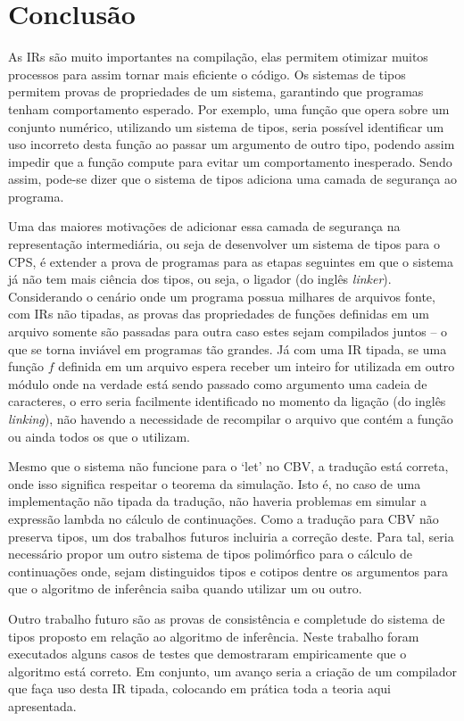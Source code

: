 \section{Conclusão}\label{sec:conclusao}
As IRs são muito importantes na compilação, elas permitem otimizar muitos processos para assim tornar mais eficiente o código.
Os sistemas de tipos permitem provas de propriedades de um sistema, garantindo que programas tenham comportamento esperado.
Por exemplo, uma função que opera sobre um conjunto numérico, utilizando um sistema de tipos, seria possível identificar um uso incorreto desta função ao passar um argumento de outro tipo, podendo assim impedir que a função compute para evitar um comportamento inesperado.
Sendo assim, pode-se dizer que o sistema de tipos adiciona uma camada de segurança ao programa.

Uma das maiores motivações de adicionar essa camada de segurança na representação intermediária, ou seja de desenvolver um sistema de tipos para o CPS, é extender a prova de programas para as etapas seguintes em que o sistema já não tem mais ciência dos tipos, ou seja, o ligador (do inglês \textit{linker}).
Considerando o cenário onde um programa possua milhares de arquivos fonte, com IRs não tipadas, as provas das propriedades de funções definidas em um arquivo somente são passadas para outra caso estes sejam compilados juntos -- o que se torna inviável em programas tão grandes.
Já com uma IR tipada, se uma função $f$ definida em um arquivo espera receber um inteiro for utilizada em outro módulo onde na verdade está sendo passado como argumento uma cadeia de caracteres, o erro seria facilmente identificado no momento da ligação (do inglês \textit{linking}), não havendo a necessidade de recompilar o arquivo que contém a função ou ainda todos os que o utilizam.

Mesmo que o sistema não funcione para o `let' no CBV, a tradução está correta, onde isso significa respeitar o teorema da simulação.
Isto é, no caso de uma implementação não tipada da tradução, não haveria problemas em simular a expressão lambda no cálculo de continuações.
Como a tradução para CBV não preserva tipos, um dos trabalhos futuros incluiria a correção deste.
Para tal, seria necessário propor um outro sistema de tipos polimórfico para o cálculo de continuações onde, sejam distinguidos tipos e cotipos dentre os argumentos para que o algoritmo de inferência saiba quando utilizar um ou outro.

Outro trabalho futuro são as provas de consistência e completude do sistema de tipos proposto em relação ao algoritmo de inferência.
Neste trabalho foram executados alguns casos de testes que demostraram empiricamente que o algoritmo está correto.
Em conjunto, um avanço seria a criação de um compilador que faça uso desta IR tipada, colocando em prática toda a teoria aqui apresentada.
